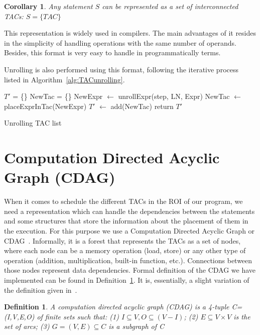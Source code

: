 \documentclass[a4paper,12pt]{memoir}
\newtheorem{definition}{Definition}[]
\newtheorem{corollary}{Corollary}[]
\begin{document}
\begin{corollary}\label{cor:TAC}
	Any statement $S$ can be represented as a set of interconnected TACs:
	$S = \{TAC\}$
\end{corollary}

This representation is widely used in compilers. The main advantages of it
resides in the simplicity of handling operations with the same number of
operands. Besides, this format is very easy to handle in programmatically terms.


Unrolling is also performed using this format, following the iterative process
listed in
Algorithm~\ref{alg:TACunrolling}.

\begin{algorithm}[H]\label{alg:TACunrolling}
	\SetAlgoLined
	$T'$ = \{\}\;
	 {
		 {
			 {
				NewTac = \{\}\;
				 {
					NewExpr $\leftarrow$ unrollExpr(step, LN, Expr)\;
					NewTac $\leftarrow$ placeExprInTac(NewExpr)\;
				}
				$T'$ $\leftarrow$ add(NewTac)\;
			}
		}
	}
	return $T'$\;
	\caption{Unrolling TAC list}
\end{algorithm}


\section{Computation Directed Acyclic Graph (CDAG)}
When it comes to schedule the different TACs in the ROI of our program, we need
a representation which can handle the dependencies between the statements and
some structures that store the information about the placement of them in the
execution. For this purpose we use a Computation Directed Acyclic Graph or
CDAG~\cite{bib:CDAGdefinition}. Informally, it is a forest that represents the
TACs as a set of nodes, where
each node can be a memory operation (load, store) or any other type of
operation (addition, multiplication, built-in function, etc.). Connections
between those nodes represent data dependencies. Formal
definition of the CDAG we have implemented can be found in
Definition~\ref{def:CDAG}. It is, essentially, a slight variation
of the definition given in~\cite{bib:CDAGdefinition}.

\theoremstyle{definition}
\begin{definition}\label{def:CDAG}
	A computation directed acyclic graph (CDAG) is a 4-tuple C=(I,V,E,O) of
	finite sets such that: (1) $I \subseteq V, O \subseteq (V-I)$; (2) $E
		\subseteq V
		\times V$ is the set of arcs; (3) $G=(V,E) \subseteq C$ is a subgraph 
		of C
\end{definition}
\end{document}
